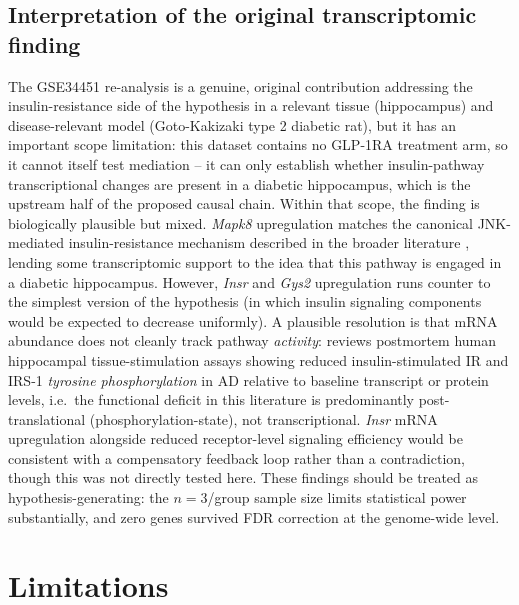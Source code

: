 \documentclass[11pt, a4paper]{article}
\begin{document}
\subsection{Interpretation of the original transcriptomic finding}
The GSE34451 re-analysis is a genuine, original contribution addressing the
insulin-resistance side of the hypothesis in a relevant tissue (hippocampus)
and disease-relevant model (Goto-Kakizaki type 2 diabetic rat), but it has
an important scope limitation: this dataset contains no GLP-1RA treatment
arm, so it cannot itself test mediation -- it can only establish whether
insulin-pathway transcriptional changes are present in a diabetic
hippocampus, which is the upstream half of the proposed causal chain. Within
that scope, the finding is biologically plausible but mixed. \textit{Mapk8}
upregulation matches the canonical JNK-mediated insulin-resistance
mechanism described in the broader literature \citep{talbot2014}, lending
some transcriptomic support to the idea that this pathway is engaged in a
diabetic hippocampus. However, \textit{Insr} and \textit{Gys2} upregulation
runs counter to the simplest version of the hypothesis (in which insulin
signaling components would be expected to decrease uniformly). A plausible
resolution is that mRNA abundance does not cleanly track pathway
\emph{activity}: \citet{talbot2014} reviews postmortem human hippocampal
tissue-stimulation assays showing reduced insulin-stimulated IR and IRS-1
\emph{tyrosine phosphorylation} in AD relative to baseline transcript or
protein levels, i.e.\ the functional deficit in this literature is
predominantly post-translational (phosphorylation-state), not
transcriptional. \textit{Insr} mRNA upregulation alongside reduced
receptor-level signaling efficiency would be consistent with a compensatory
feedback loop rather than a contradiction, though this was not directly
tested here. These findings should be treated as hypothesis-generating: the
$n=3$/group sample size limits statistical power substantially, and zero
genes survived FDR correction at the genome-wide level.

\section{Limitations}
\label{sec:limitations}
\end{document}
